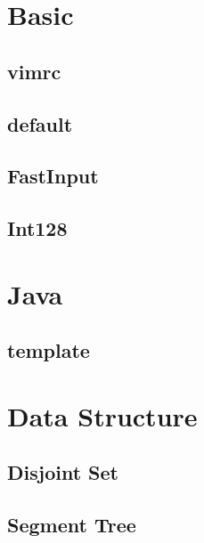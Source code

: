 \documentclass[a4paper,10pt,twocolumn,oneside]{article}
\begin{document}
\pagestyle{fancy}
\fancyfoot{}
\fancyhead[R]{\thepage}
\renewcommand{\headrulewidth}{0.4pt}
\renewcommand{\contentsname}{Contents} 

\scriptsize
\tableofcontents

\newpage

\section{Basic}
\subsection{vimrc}

\subsection{default}

\subsection{FastInput}

\subsection{Int128}


\section{Java}
\subsection{template}


\section{Data Structure}
\subsection{Disjoint Set}

\subsection{Segment Tree}

\end{document}
